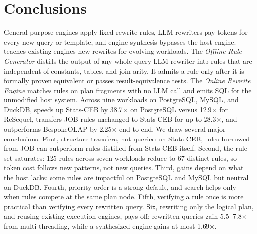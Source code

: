 \section{Conclusions}
\label{sec:conclusion}
General-purpose engines apply fixed rewrite rules, LLM rewriters pay tokens for every new query or template, and engine synthesis bypasses the host engine. {\sys} teaches existing engines new rewrites for evolving workloads. The \emph{Offline Rule Generator} distills the output of any whole-query LLM rewriter into rules that are independent of constants, tables, and join arity. It admits a rule only after it is formally proven equivalent or passes result-equivalence tests. The \emph{Online Rewrite Engine} matches rules on plan fragments with no LLM call and emits SQL for the unmodified host system. Across nine workloads on PostgreSQL, MySQL, and DuckDB, {\sys} speeds up Stats-CEB by 38.7$\times$ on PostgreSQL versus 12.9$\times$ for ReSequel, transfers JOB rules unchanged to Stats-CEB for up to 28.3$\times$, and outperforms BespokeOLAP by 2.25$\times$ end-to-end.
%
We draw several major conclusions. First, structure transfers, not queries: on Stats-CEB, rules borrowed from JOB can outperform rules distilled from Stats-CEB itself. Second, the rule set saturates: 125 rules across seven workloads reduce to 67 distinct rules, so token cost follows new patterns, not new queries. Third, gains depend on what the host lacks: some rules are impactful on PostgreSQL and MySQL but neutral on DuckDB. Fourth, priority order is a strong default, and search helps only when rules compete at the same plan node. Fifth, verifying a rule once is more practical than verifying every rewritten query. Six, rewriting only the logical plan, and reusing existing execution engines, pays off: rewritten queries gain 5.5--7.8$\times$ from multi-threading, while a synthesized engine gains at most 1.69$\times$.